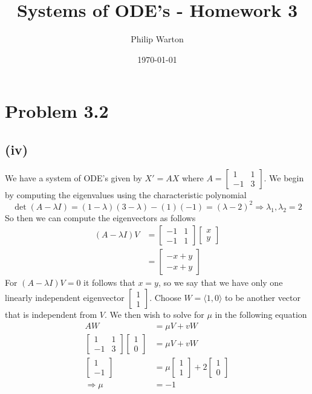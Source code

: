 \documentclass{article}
\theoremstyle{definition}
\begin{document}
\title{Systems of ODE's - Homework 3}
\author{Philip Warton}
\date{\today}
\maketitle
\section*{Problem 3.2}
\subsection*{(iv)}
We have a system of ODE's given by $X' = AX$ where $A = \begin{bmatrix}
    1&1\\-1&3
\end{bmatrix}$. We begin by computing the eigenvalues using the characteristic polynomial
\[
    \det(A - \lambda I) = (1-\lambda)(3-\lambda) - (1)(-1) = (\lambda - 2)^2 \Longrightarrow \lambda_1, \lambda_2 = 2
\]
So then we can compute the eigenvectors as follows
\begin{align*}
    (A-\lambda I)V & = \begin{bmatrix}
        -1&1\\-1&1
    \end{bmatrix}\begin{bmatrix}
        x\\y
    \end{bmatrix} \\
    &= \begin{bmatrix}
        -x + y\\-x + y
    \end{bmatrix}
\end{align*}
For $(A-\lambda I)V = 0$ it follows that $x = y$, so we say that we have only one
linearly independent eigenvector $\begin{bmatrix}
    1\\1
\end{bmatrix}$.
Choose $W = \langle 1,0 \rangle$ to be another vector that is independent from $V$.
We then wish to solve for $\mu$ in the following equation
\begin{align*}
    AW &= \mu V + vW\\
    \begin{bmatrix}
        1&1\\-1&3
    \end{bmatrix}\begin{bmatrix}
        1\\0
    \end{bmatrix}&=\mu V + v W\\
    \begin{bmatrix}
        1 \\ -1
    \end{bmatrix} & = \mu \begin{bmatrix}
        1 \\ 1
    \end{bmatrix} + 2 \begin{bmatrix}
        1 \\ 0
    \end{bmatrix}\\
    \Longrightarrow \mu & = -1
\end{align*}
\end{document}
